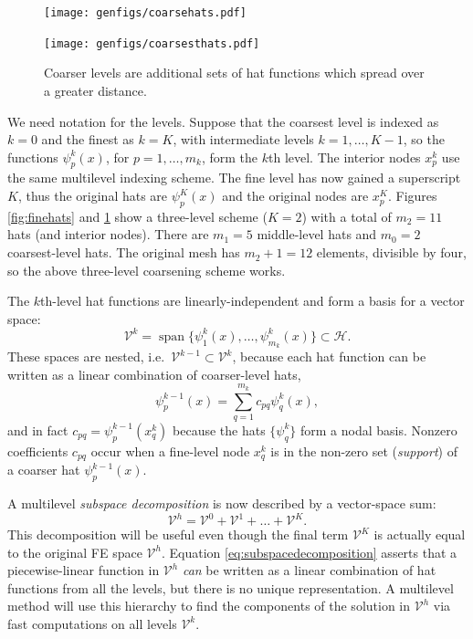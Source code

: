 \documentclass[letterpaper,final,12pt,reqno]{amsart}
\theoremstyle{claim}
\numberwithin{equation}{section}
\numberwithin{figure}{section}
\numberwithin{table}{section}
\begin{document}
\begin{figure}
\texttt{[image: genfigs/coarsehats.pdf]}
\smallskip

\texttt{[image: genfigs/coarsesthats.pdf]}
\caption{Coarser levels are additional sets of hat functions which spread over a greater distance.}
\label{fig:coarsehats}
\end{figure}

We need notation for the levels.  Suppose that the coarsest level is indexed as $k=0$ and the finest as $k=K$, with intermediate levels $k=1,\dots,K-1$, so the functions $\psi_p^k(x)$, for $p=1,\dots,m_k$, form the $k$th level.  The interior nodes $x_p^k$ use the same multilevel indexing scheme.  The fine level has now gained a superscript $K$, thus the original hats are $\psi_p^K(x)$ and the original nodes are $x_p^K$.  Figures \ref{fig:finehats} and \ref{fig:coarsehats} show a three-level scheme ($K=2$) with a total of $m_2=11$ hats (and interior nodes).  There are $m_1=5$ middle-level hats and $m_0=2$ coarsest-level hats.  The original mesh has $m_2+1=12$ elements, divisible by four, so the above three-level coarsening scheme works.

The $k$th-level hat functions are linearly-independent and form a basis for a vector space:
\begin{equation}
  \mathcal{V}^k = \operatorname{span}\{\psi_1^k(x),\dots,\psi_{m_k}^k(x)\} \subset \mathcal{H}.  \label{eq:definevk}
\end{equation}
These spaces are nested, i.e.~$\mathcal{V}^{k-1} \subset \mathcal{V}^k$, because each hat function can be written as a linear combination of coarser-level hats,
\begin{equation}
   \psi_p^{k-1}(x) = \sum_{q=1}^{m_k} c_{pq} \psi_q^k(x), \label{eq:hatcombination}
\end{equation}
and in fact $c_{pq} = \psi_p^{k-1}(x_q^k)$ because the hats $\{\psi_q^k\}$ form a nodal basis. Nonzero coefficients $c_{pq}$ occur when a fine-level node $x_q^k$ is in the non-zero set (\emph{support}) of a coarser hat $\psi_p^{k-1}(x)$.

A multilevel \emph{subspace decomposition} is now described by a vector-space sum:
\begin{equation}
  \mathcal{V}^h = \mathcal{V}^0 + \mathcal{V}^1 + \dots + \mathcal{V}^K. \label{eq:subspacedecomposition}
\end{equation}
This decomposition will be useful even though the final term $\mathcal{V}^K$ is actually equal to the original FE space $\mathcal{V}^h$.  Equation \eqref{eq:subspacedecomposition} asserts that a piecewise-linear function in $\mathcal{V}^h$ \emph{can} be written as a linear combination of hat functions from all the levels, but there is no unique representation.  A multilevel method will use this hierarchy to find the components of the solution in $\mathcal{V}^h$ via fast computations on all levels $\mathcal{V}^k$.
\end{document}

